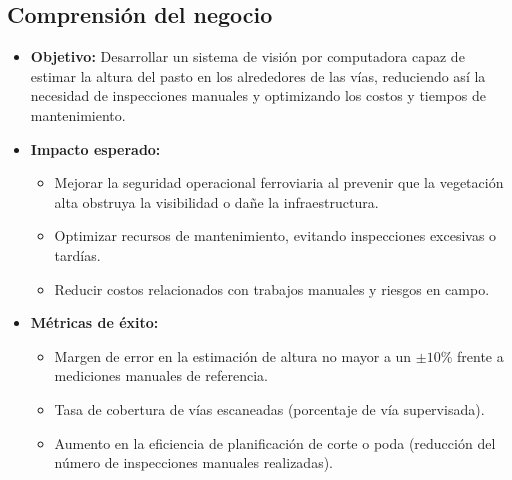 \documentclass[
11pt, %
]{ProyectoVpC}
\begin{document}
\subsection{Comprensión del negocio}
\begin{itemize}
  \item \textbf{Objetivo:} Desarrollar un sistema de visión por computadora capaz de estimar la altura del pasto en los alrededores de las vías, reduciendo así la necesidad de inspecciones manuales y optimizando los costos y tiempos de mantenimiento.
  \item \textbf{Impacto esperado:} 
    \begin{itemize}
      \item Mejorar la seguridad operacional ferroviaria al prevenir que la vegetación alta obstruya la visibilidad o dañe la infraestructura.
      \item Optimizar recursos de mantenimiento, evitando inspecciones excesivas o tardías.
      \item Reducir costos relacionados con trabajos manuales y riesgos en campo.
    \end{itemize}
  \item \textbf{Métricas de éxito:} 
    \begin{itemize}
      \item Margen de error en la estimación de altura no mayor a un $\pm10\%$ frente a mediciones manuales de referencia.
      \item Tasa de cobertura de vías escaneadas (porcentaje de vía supervisada).
      \item Aumento en la eficiencia de planificación de corte o poda (reducción del número de inspecciones manuales realizadas).
    \end{itemize}
\end{itemize}
\end{document}
